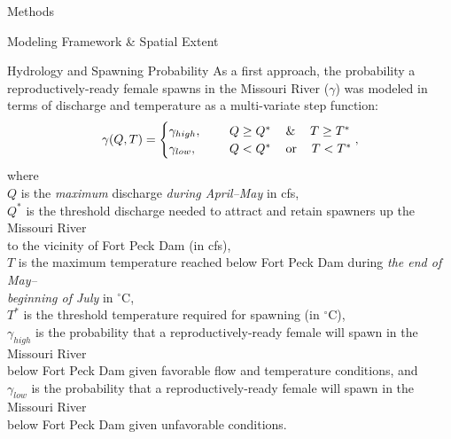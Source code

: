 \documentclass[12pt]{article}
\begin{document}
\begin{section}{Methods}
\begin{subsection}{Modeling Framework \& Spatial Extent}
\begin{subsubsection}{Hydrology and Spawning Probability}
As a first approach, the probability a reproductively-ready female spawns in the Missouri River ($\gamma$) was modeled in terms of discharge and temperature as a multi-variate step function:
\begin{equation}
\gamma(Q, T) = \begin{cases}
\gamma_{high}, & \hspace{0.5cm}  Q\geq Q^{*} \hspace{12pt} \& \hspace{12pt} T\geq T^{*}\\
\gamma_{low}, & \hspace{0.5cm}  Q< Q^{*} \hspace{12pt} \mbox{or} \hspace{12pt} T< T^{*}
\end{cases},
\end{equation}
where\\

\hspace*{0.5cm}$Q$ is the \textit{maximum} discharge \textit{during April--May} in cfs,\\
\hspace*{0.5cm}$Q^{*}$ is the threshold discharge needed to attract and retain spawners up the Missouri River\\ 
\hspace*{1.5cm}to the vicinity of Fort Peck Dam (in cfs),\\
\hspace*{0.5cm}$T$ is the maximum temperature reached below Fort Peck Dam during \textit{the end of May--\\
\hspace*{1.5cm}beginning of July} in $^{\circ}$C,\\
\hspace*{0.5cm}$T^{*}$ is the threshold temperature required for spawning (in $^{\circ}$C),\\
\hspace*{0.5cm}$\gamma_{high}$ is the probability that a reproductively-ready female will spawn in the Missouri River\\ 
\hspace*{1.5cm}below Fort Peck Dam given favorable flow and temperature conditions, and\\
\hspace*{0.5cm}$\gamma_{low}$ is the probability that a reproductively-ready female will spawn in the Missouri River\\
\hspace*{1.5cm}below Fort Peck Dam given unfavorable conditions.\\


\end{subsubsection}
\end{subsection}
\end{section}
\end{document}
